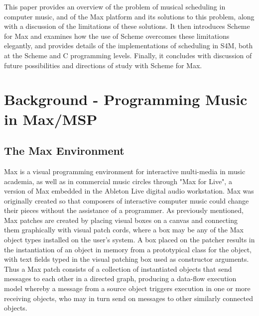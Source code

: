 \documentclass[acmsmall]{acmart}
\begin{document}
This paper provides an overview of the problem of musical scheduling
in computer music, and of the Max platform and its solutions to this problem, 
along with a discussion of the limitations of these solutions.
It then introduces Scheme for Max and examines how the use of Scheme
overcomes these limitations elegantly, and provides details of
the implementations of scheduling in S4M, both at the Scheme and
C programming levels. Finally, it concludes with discussion of future
possibilities and directions of study with Scheme for Max. 

\section{Background - Programming Music in Max/MSP}

\subsection{The Max Environment}

Max is a visual programming environment for interactive multi-media in music academia,
as well as in commercial music circles through "Max for Live", a version of Max embedded 
in the Ableton Live digital audio workstation. Max was originally
created so that composers of interactive computer music could change their pieces without the 
assistance of a programmer.
As previously mentioned, Max patches are created by placing visual boxes on a canvas 
and connecting them graphically with visual patch cords, where a box may be
any of the Max object types installed on the user's system. A box placed on the patcher
results in the instantiation of an object in memory from a prototypical class for the object, with
text fields typed in the visual patching box used as constructor arguments. 
Thus a Max patch consists of a collection of instantiated objects that send messages to each other
in a directed graph, producing a data-flow execution model whereby a message from a source 
object triggers execution in one or more 
receiving objects, who may in turn send on messages to other similarly connected objects. 
\end{document}
